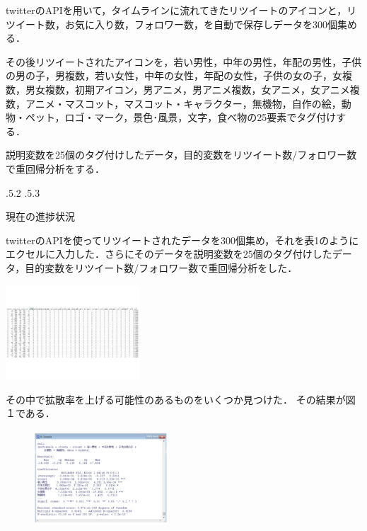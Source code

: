 \documentclass[uplatex]{jsarticle}
\makeatletter
\renewcommand{\section}{%
    \if@slide\clearpage\fi
    \@startsection{section}{1}{\z@}%
    {\Cvs \@plus.5\Cdp \@minus.2\Cdp}%
    {.5\Cvs \@plus.3\Cdp}%
    {\normalfont\raggedright}}
\makeatother
\begin{document}
twitterのAPIを用いて，タイムラインに流れてきたリツイートのアイコンと，リツイート数，お気に入り数，フォロワー数，を自動で保存しデータを300個集める．

その後リツイートされたアイコンを，若い男性，中年の男性，年配の男性，子供の男の子，男複数，若い女性，中年の女性，年配の女性，子供の女の子，女複数，男女複数，初期アイコン，男アニメ，男アニメ複数，女アニメ，女アニメ複数，アニメ・マスコット，マスコット・キャラクター，無機物，自作の絵，動物・ペット，ロゴ・マーク，景色･風景，文字，食べ物の25要素でタグ付けする．

説明変数を25個のタグ付けしたデータ，目的変数をリツイート数/フォロワー数で重回帰分析をする．













\section{現在の進捗状況}

twitterのAPIを使ってリツイートされたデータを300個集め，それを表1のようにエクセルに入力した．さらにそのデータを説明変数を25個のタグ付けしたデータ，目的変数をリツイート数/フォロワー数で重回帰分析をした．

\begin{table}
\vspace*{-\intextsep}
\caption{}\label{サンプル表}
\includegraphics[width=5cm,clip]{rtdata.pdf}
\end{table}


その中で拡散率を上げる可能性のあるものをいくつか見つけた．
その結果が図１である．

\begin{figure}
\vspace*{-\intextsep}
\includegraphics[width=5cm,clip]{images.pdf}
\caption{}\label{サンプル図}
\end{figure}
\end{document}
